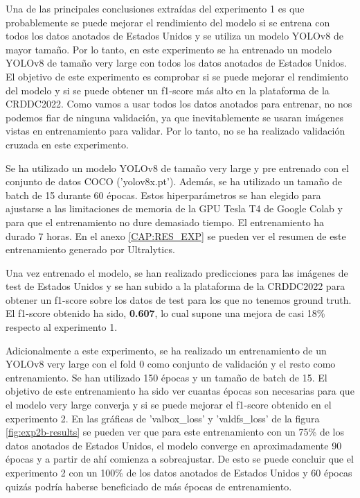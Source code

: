 Una de las principales conclusiones extraídas del experimento 1 es que probablemente se puede mejorar el rendimiento del modelo si se entrena con todos los datos anotados de Estados Unidos y se utiliza un modelo YOLOv8 de mayor tamaño. Por lo tanto, en este experimento se ha entrenado un modelo YOLOv8 de tamaño very large con todos los datos anotados de Estados Unidos. El objetivo de este experimento es comprobar si se puede mejorar el rendimiento del modelo y si se puede obtener un f1-score más alto en la plataforma de la CRDDC2022. Como vamos a usar todos los datos anotados para entrenar, no nos podemos fiar de ninguna validación, ya que inevitablemente se usaran imágenes vistas en entrenamiento para validar. Por lo tanto, no se ha realizado validación cruzada en este experimento.

Se ha utilizado un modelo YOLOv8 de tamaño very large y pre entrenado con el conjunto de datos COCO ('yolov8x.pt'). Además, se ha utilizado un tamaño de batch de 15 durante 60 épocas. Estos hiperparámetros se han elegido para ajustarse a las limitaciones de memoria de la GPU Tesla T4 de Google Colab y para que el entrenamiento no dure demasiado tiempo. El entrenamiento ha durado 7 horas. En el anexo \ref{CAP:RES_EXP} se pueden ver el resumen de este entrenamiento generado por Ultralytics.

Una vez entrenado el modelo, se han realizado predicciones para las imágenes de test de Estados Unidos y se han subido a la plataforma de la CRDDC2022 para obtener un f1-score sobre los datos de test para los que no tenemos ground truth. El f1-score obtenido ha sido, \textbf{0.607}, lo cual supone una mejora de casi 18\% respecto al experimento 1.

Adicionalmente a este experimento, se ha realizado un entrenamiento de un YOLOv8 very large con el fold 0 como conjunto de validación y el resto como entrenamiento. Se han utilizado 150 épocas y un tamaño de batch de 15. El objetivo de este entrenamiento ha sido ver cuantas épocas son necesarias para que el modelo very large converja y si se puede mejorar el f1-score obtenido en el experimento 2. En las gráficas de 'val\/box\_loss' y 'val\/dfs\_loss' de la figura \ref{fig:exp2b-results} se pueden ver que para este entrenamiento con un 75\% de los datos anotados de Estados Unidos, el modelo converge en aproximadamente 90 épocas y a partir de ahí comienza a sobreajustar. De esto se puede concluir que el experimento 2 con un 100\% de los datos anotados de Estados Unidos y 60 épocas quizás podría haberse beneficiado de más épocas de entrenamiento.


